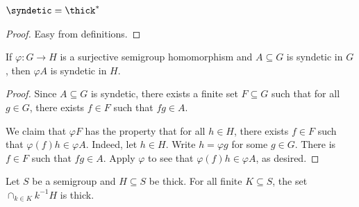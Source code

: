 \begin{lemma}
    \label{lemma_synd_thick_dual}
    \leanok{}
    $\syndetic = \thick^*$
\end{lemma}

\begin{proof}
\leanok{}
    Easy from definitions.
\end{proof}



\begin{lemma}
    \label{lemma_image_of_syndetic}
    \leanok{}
    If $\varphi: G \to H$ is a surjective semigroup homomorphism and $A \subseteq G$ is syndetic in $G$, then $\varphi A$ is syndetic in $H$.
\end{lemma}

\begin{proof}
\leanok{}
    Since $A \subseteq G$ is syndetic, there exists a finite set $F \subseteq G$ such that for all $g \in G$, there exists $f \in F$ such that $fg \in A$.

    We claim that $\varphi F$ has the property that for all $h \in H$, there exists $f \in F$ such that $\varphi(f)h \in \varphi A$.  Indeed, let $h \in H$.  Write $h = \varphi g$ for some $g \in G$.  There is $f \in F$ such that $fg \in A$.  Apply $\varphi$ to see that $\varphi(f) h \in \varphi A$, as desired.
\end{proof}

\begin{lemma}
    \label{lemma_thick_inverse_shift_intersections}
    \label{lemma_preimage_intersection_of_thick_is_thick}
    \leanok{}
    Let $S$ be a semigroup and $H \subseteq S$ be thick.  For all finite $K \subseteq S$, the set $\cap_{k \in K} k^{-1} H$ is thick.
\end{lemma}

